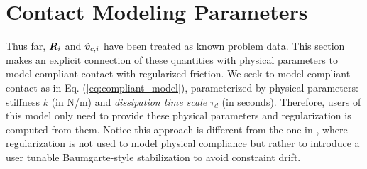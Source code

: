 
\section{Contact Modeling Parameters}
\label{sec:contact_modeling_parameters}

Thus far, ${\bm{R}}_i$ and $\hat{{\bm{v}}}_{c,i}$ have been treated as known problem
data. This section makes an explicit connection of these quantities with
physical parameters to model compliant contact with regularized friction. We
seek to model compliant contact as in Eq. (\ref{eq:compliant_model}),
parameterized by physical parameters: stiffness $k$ (in N/m) and
\textit{dissipation time scale} $\tau_d$ (in seconds). Therefore, users of this
model only need to provide these physical parameters and regularization is
computed from them. Notice this approach is different from the one in
\cite{bib:todorov2014}, where regularization is not used to model physical
compliance but rather to introduce a user tunable Baumgarte-style stabilization
to avoid constraint drift. 



